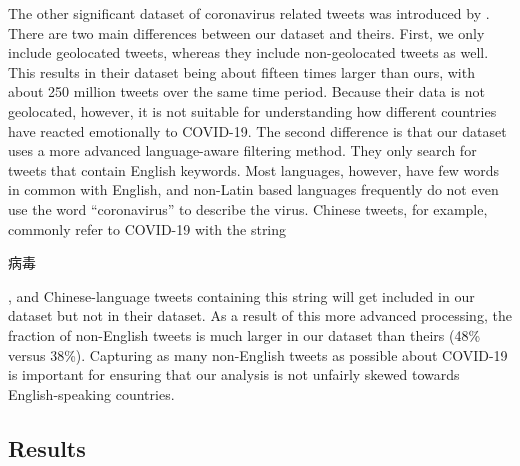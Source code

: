 \documentclass[11pt]{article}
\newcommand{\bertmoji}{\texttt{BERTmoticon}}
\DeclareMathOperator{\emoticon}{\texttt{TwitterEmoticon}}
\DeclareMathOperator{\corona}{\texttt{TwitterCOVID}}
\begin{document}
The other significant dataset of coronavirus related tweets was introduced by \citet{chen2020tracking}.
There are two main differences between our dataset and theirs.
First, we only include geolocated tweets,
whereas they include non-geolocated tweets as well.
This results in their dataset being about fifteen times larger than ours,
with about 250 million tweets over the same time period.
Because their data is not geolocated, however, it is not suitable for understanding how different countries have reacted emotionally to COVID-19.
The second difference is that our dataset uses a more advanced language-aware filtering method.
They only search for tweets that contain English keywords.
Most languages, however, have few words in common with English,
and non-Latin based languages frequently do not even use the word ``coronavirus'' to describe the virus.
Chinese tweets, for example, commonly refer to COVID-19 with the string
\begin{CJK}{UTF8}{gbsn}
病毒
\end{CJK},
and Chinese-language tweets containing this string will get included in our dataset but not in their dataset.
As a result of this more advanced processing, the fraction of non-English tweets is much larger in our dataset than theirs (48\% versus 38\%).
Capturing as many non-English tweets as possible about COVID-19 is important for ensuring that our analysis is not unfairly skewed towards English-speaking countries.



\subsection{Results}
\end{document}
